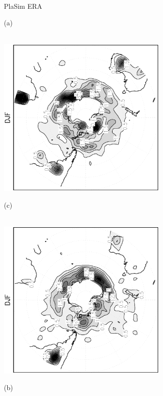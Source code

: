 \documentclass[12pt,a4paper,twoside,openright,headinclude,liststotoc,bibtotoc]{scrreprt}
\begin{document}
\begin{appendix}
\begin{figure}[c]
\hspace{3.8cm}PlaSim \vspace{0.2cm} \hspace{7.3cm} ERA \\
\parbox{8.5cm}{\hspace{0.95cm}\begin{scriptsize}(a)\end{scriptsize} \vspace{-0.5cm} \\
\includegraphics[height=8.0cm,angle=-90]
{eps/cycllys_PLASIM_T21_45DJF_SH.eps}
}
\parbox{8.5cm}{\hspace{0.95cm}\begin{scriptsize}(c)\end{scriptsize} \vspace{-0.5cm} \\
\includegraphics[height=8.0cm,angle=-90]
{eps/cycllys_ERA40_T21_45DJF_SH.eps}
}
\parbox{8.5cm}{\hspace{0.95cm}\begin{scriptsize}(b)\end{scriptsize} \vspace{-0.5cm} \\
}
\end{figure}
\end{appendix}
\end{document}
